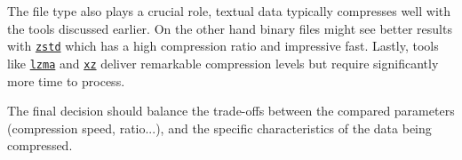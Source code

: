 \documentclass[12pt, a4paper]{report}
\begin{document}
The file type also plays a crucial role, textual data typically compresses well with the tools discussed earlier.
On the other hand binary files might see better results with \hyperref[subsec:zstd]{\texttt{zstd}} which has a high compression
ratio and impressive fast.
Lastly, tools like \hyperref[subsec:lzma]{\texttt{lzma}} and \hyperref[subsec:xz]{\texttt{xz}} deliver remarkable compression
levels but require significantly more time to process.

The final decision should balance the trade-offs between the compared parameters (compression speed, ratio...), and the specific
characteristics of the data being compressed.

\label{mylastpage}
\printbibliography
\thispagestyle{empty} %
\pagestyle{empty} %
\end{document}
